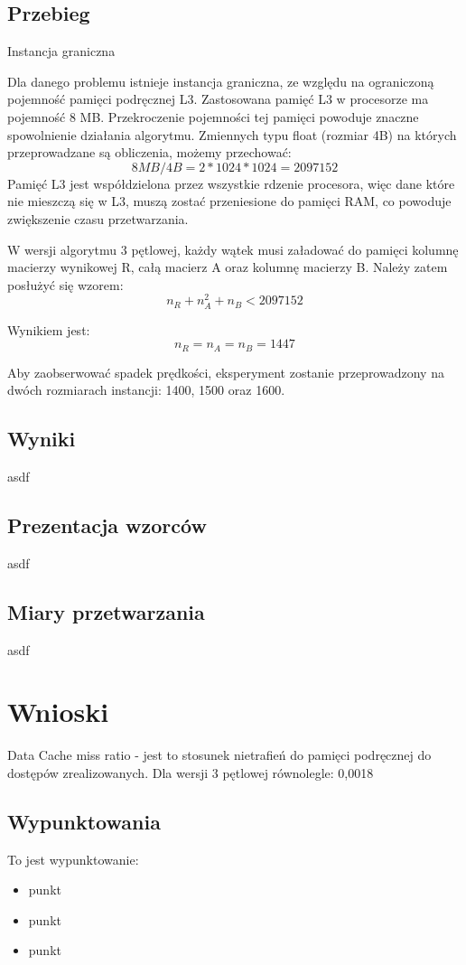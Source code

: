 \documentclass{article}
\begin{document}
\subsection{Przebieg}
Instancja graniczna

Dla danego problemu istnieje instancja graniczna, ze względu na ograniczoną pojemność pamięci podręcznej L3. Zastosowana pamięć L3 w procesorze ma pojemność 8 MB. Przekroczenie pojemności tej pamięci powoduje znaczne spowolnienie działania algorytmu. Zmiennych typu float (rozmiar 4B) na których przeprowadzane są obliczenia, możemy przechować: 
\[ 8MB/4B = 2 * 1024 * 1024 = 2097152 \]
Pamięć L3 jest współdzielona przez wszystkie rdzenie procesora, więc dane które nie mieszczą się w L3, muszą zostać przeniesione do pamięci RAM, co powoduje zwiększenie czasu przetwarzania.

W wersji algorytmu 3 pętlowej, każdy wątek musi załadować do pamięci kolumnę macierzy wynikowej R, całą macierz A oraz kolumnę macierzy B.
Należy zatem posłużyć się wzorem:
\[ n_R + n_A^2 + n_B < 2097152 \]

Wynikiem jest:
\[ n_R = n_A = n_B = 1447\]

Aby zaobserwować spadek prędkości, eksperyment zostanie przeprowadzony na dwóch rozmiarach instancji: 1400,  1500 oraz 1600.


\subsection{Wyniki}
asdf
\subsection{Prezentacja wzorców}
asdf
\subsection{Miary przetwarzania}
asdf

\section{Wnioski}
Data Cache miss ratio - jest to stosunek nietrafień do pamięci podręcznej do dostępów zrealizowanych.
\n
Dla wersji 3 pętlowej równolegle: 0,0018


\subsection{Wypunktowania}
To jest wypunktowanie:
\begin{itemize}
\item punkt
\item punkt
\item punkt
\end{itemize}
\end{document}
